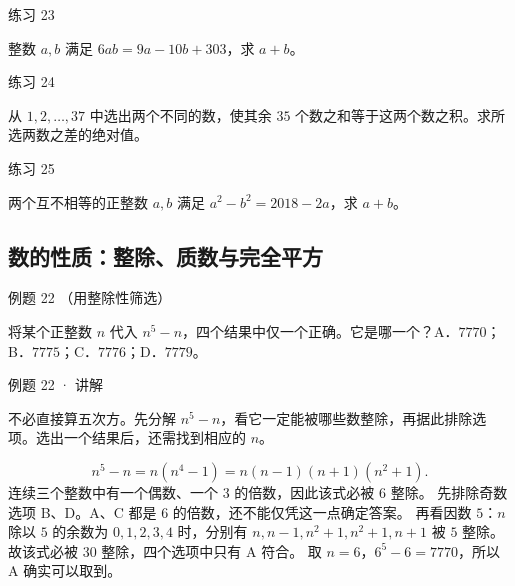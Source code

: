 \begin{problem}{练习 23}

整数 $a,b$ 满足 $6ab=9a-10b+303$，求 $a+b$。

\end{problem}

\begin{problem}{练习 24}

从 $1,2,\ldots,37$ 中选出两个不同的数，使其余 $35$ 个数之和等于这两个数之积。求所选两数之差的绝对值。

\end{problem}

\begin{problem}{练习 25}

两个互不相等的正整数 $a,b$ 满足 $a^2-b^2=2018-2a$，求 $a+b$。

\end{problem}


\subsection{数的性质：整除、质数与完全平方}



\begin{problem}{例题 22 （用整除性筛选）}

将某个正整数 $n$ 代入 $n^5-n$，四个结果中仅一个正确。它是哪一个？A．$7770$；B．$7775$；C．$7776$；D．$7779$。

\end{problem}


\begin{solution}{例题 22 · 讲解}

\think 不必直接算五次方。先分解 $n^5-n$，看它一定能被哪些数整除，再据此排除选项。选出一个结果后，还需找到相应的 $n$。

\solve \[n^5-n=n(n^4-1)=n(n-1)(n+1)(n^2+1).\]
连续三个整数中有一个偶数、一个 $\boxed{3\text{ 的倍数}}$，因此该式必被 $6$ 整除。
先排除奇数选项 B、D。A、C 都是 $6$ 的倍数，还不能仅凭这一点确定答案。
再看因数 $5$：$n$ 除以 $5$ 的余数为 $0,1,2,3,4$ 时，分别有 $n,n-1,n^2+1,n^2+1,n+1$ 被 $5$ 整除。
故该式必被 $30$ 整除，四个选项中只有 A 符合。
取 $n=6$，$6^5-6=7770$，所以 A 确实可以取到。


\end{solution}

